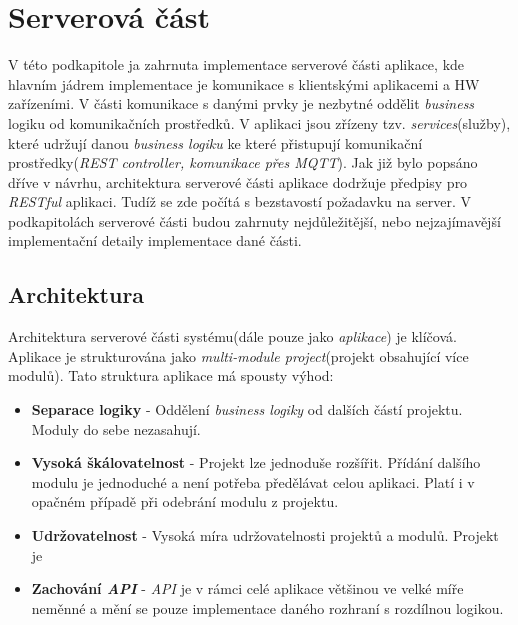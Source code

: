 \section{Serverová část}
\label{impl:backend}
V této podkapitole ja zahrnuta implementace serverové části aplikace, kde hlavním jádrem implementace je komunikace s klientskými aplikacemi a HW zařízeními.
V části komunikace s danými prvky je nezbytné oddělit \emph{business} logiku od komunikačních prostředků.
V aplikaci jsou zřízeny tzv. \emph{services}(služby), které udržují danou \emph{business logiku} ke které přistupují komunikační prostředky(\emph{REST controller, komunikace přes MQTT}).
Jak již bylo popsáno dříve v návrhu, architektura serverové části aplikace dodržuje předpisy pro \emph{RESTful} aplikaci.
Tudíž se zde počítá s bezstavostí požadavku na server.
V podkapitolách serverové části budou zahrnuty nejdůležitější, nebo nejzajímavější implementační detaily implementace dané části.

\subsection*{Architektura}
\label{impl:backend:architektura}
Architektura serverové části systému(dále pouze jako \emph{aplikace}) je klíčová.
Aplikace je strukturována jako \emph{multi-module project}(projekt obsahující více modulů).
\newline
Tato struktura aplikace má spousty výhod:
\begin{itemize}
  \item \textbf{Separace logiky} - Oddělení \emph{business logiky} od dalších částí projektu. Moduly do sebe nezasahují.
  \item \textbf{Vysoká škálovatelnost} - Projekt lze jednoduše rozšířit. Přídání dalšího modulu je jednoduché a není potřeba předělávat celou aplikaci. Platí i v opačném případě při odebrání modulu z projektu.
  \item \textbf{Udržovatelnost} - Vysoká míra udržovatelnosti projektů a modulů. Projekt je
  \item \textbf{Zachování \emph{API}} - \emph{API} je v rámci celé aplikace většinou ve velké míře neměnné a mění se pouze implementace daného rozhraní s rozdílnou logikou.
\end{itemize}

